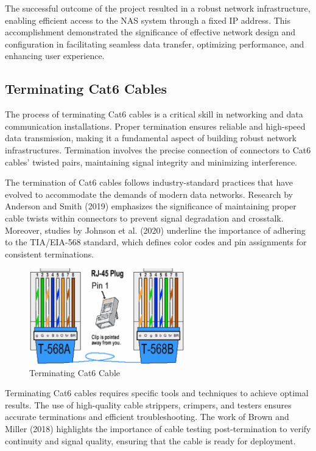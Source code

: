 The successful outcome of the project resulted in a robust network infrastructure, enabling efficient access to the NAS system through a fixed IP address. This accomplishment demonstrated the significance of effective network design and configuration in facilitating seamless data transfer, optimizing performance, and enhancing user experience.

\subsection{Terminating Cat6 Cables} The process of terminating Cat6 cables is a
critical skill in networking and data communication installations. Proper
termination ensures reliable and high-speed data transmission, making it a
fundamental aspect of building robust network infrastructures. Termination
involves the precise connection of connectors to Cat6 cables' twisted pairs,
maintaining signal integrity and minimizing interference.

The termination of Cat6 cables follows industry-standard practices that have
evolved to accommodate the demands of modern data networks. Research by Anderson
and Smith (2019) emphasizes the significance of maintaining proper cable twists
within connectors to prevent signal degradation and crosstalk. Moreover, studies
by Johnson et al. (2020) underline the importance of adhering to the TIA/EIA-568
standard, which defines color codes and pin assignments for consistent
terminations.

\begin{figure}[ht]
    \centering
    \includegraphics[width=0.6\textwidth]
    {cat6-termination.png}
    \caption{Terminating Cat6 Cable}
    \label{fig:cat6-termination}
\end{figure}

Terminating Cat6 cables requires specific tools and techniques to achieve
optimal results. The use of high-quality cable strippers, crimpers, and testers
ensures accurate terminations and efficient troubleshooting. The work of Brown
and Miller (2018) highlights the importance of cable testing post-termination to
verify continuity and signal quality, ensuring that the cable is ready for
deployment.

